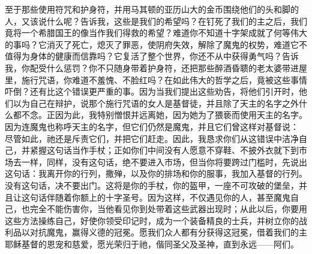 至于那些使用符咒和护身符，并用马其顿的亚历山大的金币围绕他们的头和脚的人，又该说什么呢？告诉我，这些是我们的希望吗？在钉死了我们的主之后，我们竟将一个希腊国王的像当作我们得救的希望？难道你不知道十字架成就了何等伟大的事吗？它消灭了死亡，熄灭了罪恶，使阴府失效，解除了魔鬼的权势，难道它不值得为身体的健康而信靠吗？它复活了整个世界，你还不从中获得勇气吗？告诉我，你配受什么惩罚？你不只随身带着护身符，还把那些醉酒昏聩的老太婆带进屋里，施行咒语，你难道不羞愧、不脸红吗？在如此伟大的哲学之后，竟被这些事情吓倒？还有比这个错误更严重的事。因为当我们提出这些劝告，将他们引开时，他们以为自己在辩护，说那个施行咒语的女人是基督徒，并且除了天主的名字之外什么都不念。正因为此，我特别憎恨并远离她，因为她为了猥亵而使用天主的名字。因为连魔鬼也称呼天主的名字，但它们仍然是魔鬼，并且它们曾这样对基督说：  尽管如此，祂还是斥责它们，并把它们赶走。因此，我恳求你们从这错误中洁净自己，并紧握这句话当作手杖；正如你们中间没有人愿意不穿鞋、不披外衣就下到市场去一样，同样，没有这句话，绝不要进入市场，但当你将要跨过门槛时，先说出这句话：我离开你的行列，撒殚，以及你的排场和你的服事，我加入基督的行列。没有这句话，决不要出门。这将是你的手杖，你的盔甲，一座不可攻破的堡垒，并且让这句话伴随着你额上的十字圣号。因为这样，不仅遇见你的人，甚至魔鬼自己，也完全不能伤害你，当他看见你到处带着这些武器出现时；从此以后，你要用这些方法操练自己，好使你领受印记时，成为一个装备精良的士兵，并树立你的战利品以对抗魔鬼，赢得义德的冠冕。愿我们众人都有分获得这冠冕，借着我们的主耶稣基督的恩宠和慈爱，愿光荣归于祂，偕同圣父及圣神，直到永远——阿们。\par

